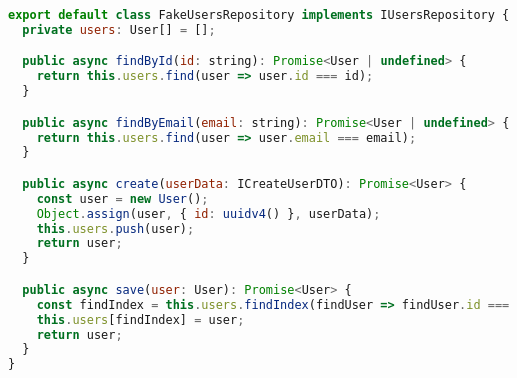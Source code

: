 \begin{lstlisting}[language=JavaScript, caption={Implementação para uso em testes unitários},captionpos=b, label=alg:fakeusersrepository]
export default class FakeUsersRepository implements IUsersRepository {
  private users: User[] = [];

  public async findById(id: string): Promise<User | undefined> {
    return this.users.find(user => user.id === id);
  }

  public async findByEmail(email: string): Promise<User | undefined> {
    return this.users.find(user => user.email === email);
  }

  public async create(userData: ICreateUserDTO): Promise<User> {
    const user = new User();
    Object.assign(user, { id: uuidv4() }, userData);
    this.users.push(user);
    return user;
  }

  public async save(user: User): Promise<User> {
    const findIndex = this.users.findIndex(findUser => findUser.id === user.id);
    this.users[findIndex] = user;
    return user;
  }
}
\end{lstlisting}